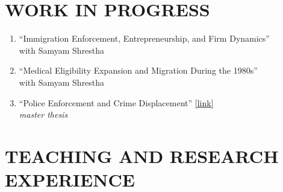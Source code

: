 \documentclass[11pt,letterpaper]{article}
\begin{document}
\section*{WORK IN PROGRESS}
\begin{enumerate}
    \item ``Immigration Enforcement, Entrepreneurship, and Firm Dynamics'' \\
    with Samyam Shrestha

    \item ``Medical Eligibility Expansion and Migration During the 1980s'' \\
    with Samyam Shrestha

    \item ``Police Enforcement and Crime Displacement'' \href{https://github.com/hugosantanna}{[link]} \\
    \textit{master thesis}
\end{enumerate}

\section*{TEACHING AND RESEARCH EXPERIENCE}
\end{document}
